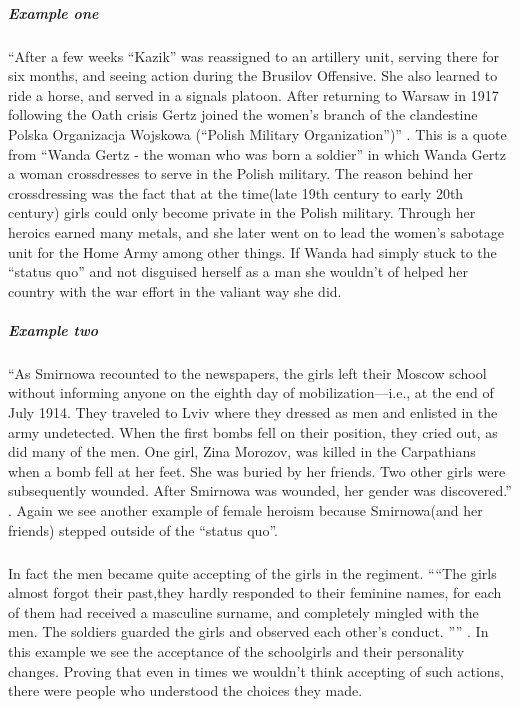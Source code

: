 \subparagraph{Example one}
``After a few weeks ``Kazik'' was reassigned to an artillery unit, serving there
for six months, and seeing action during the Brusilov Offensive. She also
learned to ride a horse, and served in a signals platoon. After returning to
Warsaw in 1917 following the Oath crisis Gertz joined the women's branch of the
clandestine Polska Organizacja Wojskowa (``Polish Military Organization'')''
\cite{TWBS}. This is a quote from ``Wanda Gertz - the woman who was born a
soldier'' in which Wanda Gertz a woman crossdresses to serve in the Polish
military. The reason behind her crossdressing was the fact that at the
time(late 19th century to early 20th century) girls could only become private in
the Polish military. Through her heroics earned many metals, and she later went
on to lead the women's sabotage unit for the Home Army among other things. If
Wanda had simply stuck to the ``status quo'' and not disguised herself as a man
she wouldn't of helped her country with the war effort in the valiant way she
did.
\par

\newpage
\subparagraph{Example two}
``As Smirnowa recounted to the newspapers, the girls left their Moscow school
without informing anyone on the eighth day of mobilization---i.e., at the end of
July 1914. They traveled to Lviv where they dressed as men and enlisted in the
army undetected. When the first bombs fell on their position, they cried out,
as did many of the men. One girl, Zina Morozov, was killed in the Carpathians
when a bomb fell at her feet. She was buried by her friends. Two other girls
were subsequently wounded. After Smirnowa was wounded, her gender was
discovered.'' \cite[p.~365-67]{YGFRF}. Again we see another example of female
heroism because Smirnowa(and her friends) stepped outside of the ``status quo''.
\par

\subparagraph{}
In fact the men became quite accepting of the girls in the regiment.
````The girls almost forgot their past,they hardly responded to their feminine
names, for each of them had received a masculine surname, and completely mingled
with the men. The soldiers guarded the girls and observed each other's conduct.
'''' \cite[p.~366]{YGFRF}. In this example we see the acceptance of the
schoolgirls and their personality changes. Proving that even in times we
wouldn't think accepting of such actions, there were people who understood the
choices they made.
\par


